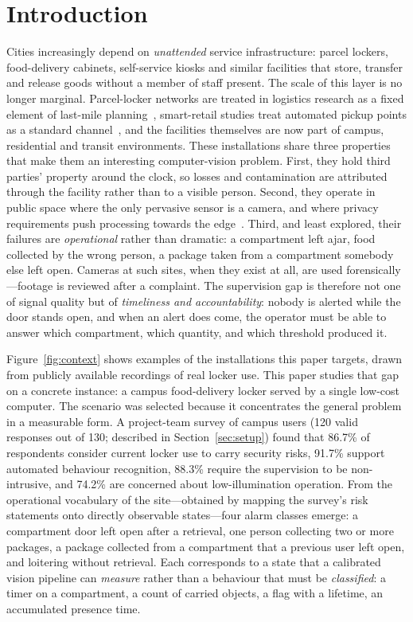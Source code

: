\documentclass[journal,article,submit,oneauthor]{Definitions/mdpi}
\begin{document}
\section{Introduction}
\label{sec:intro}

Cities increasingly depend on \emph{unattended} service infrastructure: parcel lockers,
food-delivery cabinets, self-service kiosks and similar facilities that store, transfer and
release goods without a member of staff present. The scale of this layer is no longer
marginal. Parcel-locker networks are treated in logistics research as a fixed element of
last-mile planning~\cite{lai2021parcel,li2025parcel,zhang2025campus}, smart-retail studies
treat automated pickup points as a standard channel~\cite{pantano2014smart}, and the
facilities themselves are now part of campus, residential and transit environments. These
installations share three properties that make them an interesting computer-vision problem.
First, they hold third parties' property around the clock, so losses and contamination are
attributed through the facility rather than to a visible person. Second, they operate in
public space where the only pervasive sensor is a camera, and where privacy requirements
push processing towards the edge~\cite{shi2016edge,ribaric2016deid}. Third, and least
explored, their failures are \emph{operational} rather than dramatic: a compartment left
ajar, food collected by the wrong person, a package taken from a compartment somebody else
left open. Cameras at such sites, when they exist at all, are used forensically---footage is
reviewed after a complaint. The supervision gap is therefore not one of signal quality but
of \emph{timeliness and accountability}: nobody is alerted while the door stands open, and
when an alert does come, the operator must be able to answer which compartment, which
quantity, and which threshold produced it.

Figure~\ref{fig:context} shows examples of the installations this paper targets, drawn
from publicly available recordings of real locker use. This paper studies that gap on a concrete instance: a campus food-delivery locker served by
a single low-cost computer. The scenario was selected because it concentrates the general
problem in a measurable form. A project-team survey of campus users (120 valid responses out
of 130; described in Section~\ref{sec:setup}) found that 86.7\% of respondents consider
current locker use to carry security risks, 91.7\% support automated behaviour recognition,
88.3\% require the supervision to be non-intrusive, and 74.2\% are concerned about
low-illumination operation. From the operational vocabulary of the site---obtained by
mapping the survey's risk statements onto directly observable states---four alarm classes
emerge: a compartment door left open after a retrieval, one person collecting two or more
packages, a package collected from a compartment that a previous user left open, and
loitering without retrieval. Each corresponds to a state that a calibrated vision pipeline
can \emph{measure} rather than a behaviour that must be \emph{classified}: a timer on a
compartment, a count of carried objects, a flag with a lifetime, an accumulated presence
time.
\end{document}
